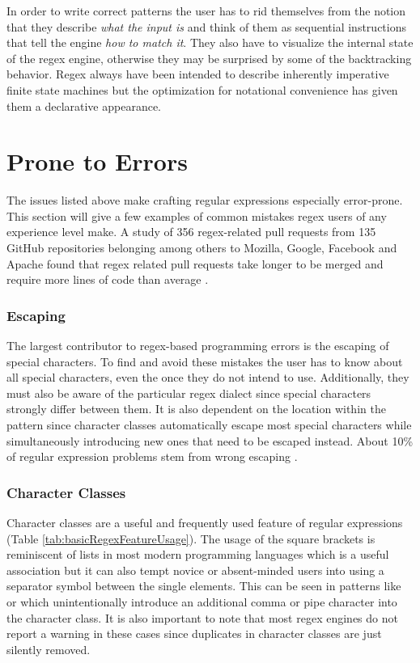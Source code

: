 In order to write correct patterns the user has to rid themselves from the notion that they describe \emph{what the input is} and think of them as sequential instructions that tell the engine \emph{how to match it}. They also have to visualize the internal state of the regex engine, otherwise they may be surprised by some of the backtracking behavior. Regex always have been intended to describe inherently imperative finite state machines but the optimization for notational convenience has given them a declarative appearance.

\section{Prone to Errors}

The issues listed above make crafting regular expressions especially error-prone. This section will give a few examples of common mistakes regex users of any experience level make. A study of 356 regex-related pull requests from 135 GitHub repositories belonging among others to Mozilla, Google, Facebook and Apache found that regex related pull requests take longer to be merged and require more lines of code than average \cite{DemystifyingRegexBugs}.

\subsubsection{Escaping}

The largest contributor to regex-based programming errors is the escaping of special characters. To find and avoid these mistakes the user has to know about all special characters, even the once they do not intend to use. Additionally, they must also be aware of the particular regex dialect since special characters strongly differ between them. It is also dependent on the location within the pattern since character classes automatically escape most special characters while simultaneously introducing new ones that need to be escaped instead. About 10\% of regular expression problems stem from wrong escaping \cite{DemystifyingRegexBugs}. 

\subsubsection{Character Classes}

Character classes are a useful and frequently used feature of regular expressions (Table \ref{tab:basicRegexFeatureUsage}). The usage of the square brackets is reminiscent of lists in most modern programming languages which is a useful association but it can also tempt novice or absent-minded users into using a separator symbol between the single elements. This can be seen in patterns like \pattern{[0,2,3,5-9]} \cite{RegexErrorNlpChinaCharClassSep} or \pattern{[3|4|5|7|8]} \cite{RegexErrorRoncooCharClassSep} which unintentionally introduce an additional comma or pipe character into the character class. It is also important to note that most regex engines do not report a warning in these cases since duplicates in character classes are just silently removed.

